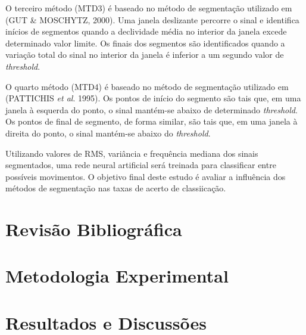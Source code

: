 \documentclass[
	12pt,				%
	openright,			%
	oneside,			%
	a4paper,			%
	english,			%
	francais,			%
	spanish,			%
	brazil				%
	]{abntex2}
\begin{document}
O terceiro método (MTD3) é baseado no método de segmentação utilizado em (GUT \& MOSCHYTZ, 2000). Uma janela deslizante percorre o sinal e identifica inícios de segmentos quando a declividade média no interior da janela excede determinado valor limite. Os finais dos segmentos são identificados quando a variação total do sinal no interior da janela é inferior a um segundo valor de \emph{threshold}.

O quarto método (MTD4) é baseado no método de segmentação utilizado em (PATTICHIS \emph{et al}. 1995). Os pontos de início do segmento são tais que, em uma janela à esquerda do ponto, o sinal mantém-se abaixo de determinado \emph{threshold}. Os pontos de final de segmento, de forma similar, são tais que, em uma janela à direita do ponto, o sinal mantém-se abaixo do \emph{threshold}.

Utilizando valores de RMS, variância e frequência mediana dos sinais segmentados, uma rede neural artificial será treinada para classificar entre possíveis movimentos. O objetivo final deste estudo é avaliar a influência dos métodos de segmentação nas taxas de acerto de classiicação.

\chapter{Revisão Bibliográfica}


\chapter{Metodologia Experimental}


%

\chapter{Resultados e Discussões}

\end{document}
